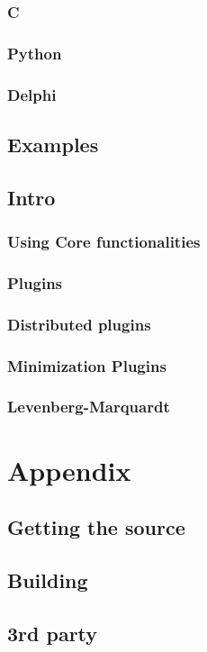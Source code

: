 \documentclass[12pt, letter, oneside]{book}
\begin{document}
\subsubsection{C}
\subsubsection{Python}
\subsubsection{Delphi}
\subsection{Examples}
\subsection{Intro}
\subsubsection{Using Core functionalities}
\subsubsection{Plugins}
\subsubsection{Distributed plugins }
\subsubsection{Minimization Plugins}
\subsubsection{Levenberg-Marquardt}
\section{Appendix}
\subsection{Getting the source}
\subsection{Building}
\subsection{3rd party}
\end{document}
